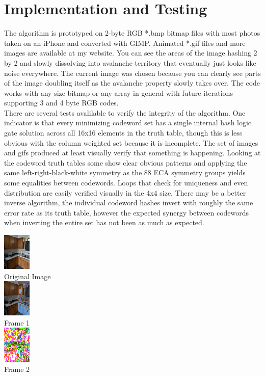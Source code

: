 \documentclass[11pt]{article}
\begin{document}
\section{Implementation and Testing}

The algorithm is prototyped on 2-byte RGB *.bmp bitmap files with most photos taken on an iPhone and converted with GIMP. Animated *.gif files and more images are available at my website. You can see the areas of the image hashing 2 by 2 and slowly dissolving into avalanche territory that eventually just looks like noise everywhere. The current image was chosen because you can clearly see parts of the image doubling itself as the avalanche property slowly takes over. The code works with any size bitmap or any array in general with future iterations supporting 3 and 4 byte RGB codes. \\

There are several tests avalilable to verify the integrity of the algorithm. One indicator is that every minimizing codeword set has a single internal hash logic gate solution across all 16x16 elements in the truth table, though this is less obvious with the column weighted set because it is incomplete. The set of images and gifs produced at least visually verify that something is happening. Looking at the codeword truth tables some show clear obvious patterns and applying the same left-right-black-white symmetry as the 88 ECA symmetry groups \cite{Wolfram} yields some equalities between codewords. Loops that check for uniqueness and even distribution are easily verified visually in the 4x4 size. There may be a better inverse algorithm, the individual codeword hashes invert with roughly the same error rate as its truth table, however the expected synergy between codewords when inverting the entire set has not been as much as expected.\\

\begin{center}
\includegraphics{kitchenShrunkresized}\\
Original Image\\
\includegraphics{kitchenShrunkframes0}\\
Frame 1\\
\includegraphics{kitchenShrunkframes1}\\
Frame 2\\
\end{center}
\end{document}
